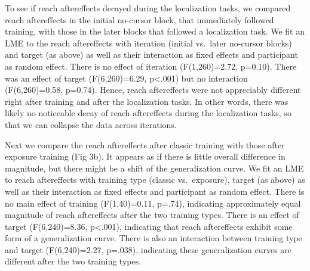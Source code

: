 \documentclass[10pt,letterpaper]{article}
\begin{document}
To see if reach aftereffects decayed during the localization tasks, we
compared reach aftereffects in the initial no-cursor block, that
immediately followed training, with those in the later blocks that
followed a localization task. We fit an LME to the reach aftereffects
with iteration (initial vs.~later no-cursor blocks) and target (as
above) as well as their interaction as fixed effects and participant as
random effect. There is no effect of iteration (F(1,260)=2.72, p=0.10).
There was an effect of target (F(6,260)=6.29, p\textless{}.001) but no
interaction (F(6,260)=0.58, p=0.74). Hence, reach aftereffects were not
appreciably different right after training and after the localization
tasks. In other words, there was likely no noticeable decay of reach
aftereffects during the localization tasks, so that we can collapse the
data across iterations.

Next we compare the reach aftereffects after classic training with those
after exposure training (Fig 3b). It appears as if there is little
overall difference in magnitude, but there might be a shift of the
generalization curve. We fit an LME to reach aftereffects with training
type (classic vs.~exposure), target (as above) as well as their
interaction as fixed effects and participant as random effect. There is
no main effect of training (F(1,40)=0.11, p=.74), indicating
approximately equal magnitude of reach aftereffects after the two
training types. There is an effect of target (F(6,240)=8.36,
p\textless{}.001), indicating that reach aftereffects exhibit some form
of a generalization curve. There is also an interaction between training
type and target (F(6,240)=2.27, p=.038), indicating these generalization
curves are different after the two training types.
\end{document}
